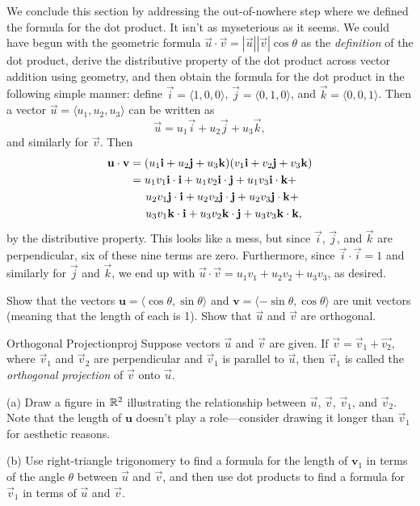 \documentclass{watsonbook}
\begin{document}
We conclude this section by addressing the out-of-nowhere step where
we defined the formula for the dot product. It isn't as myseterious as
it seems. We could have begun with the geometric formula
$\vec{u} \cdot \vec{v} = |\vec{u}| |\vec{v}| \cos\theta$
as the \textit{definition} of the dot product, derive the distributive
property of the dot product across vector addition using geometry, and
then obtain the formula for the dot product in the following simple
manner: define $\vec{i} = \langle1,0,0\rangle$,
$\vec{j} = \langle0,1,0\rangle$, and
$\vec{k} = \langle0,0,1\rangle$. Then a vector
$\vec{u} = \langle u_1, u_2, u_3\rangle$ can be written as
\[
\vec{u} = u_1 \vec{i} + u_2 \vec{j} + u_3 \vec{k},
\]
and similarly for $\vec{v}$. Then 
\begin{align*}
  \vec{u} \cdot \vec{v} &= (u_1 \vec{i} + u_2 \vec{j} + u_3
  \vec{k})(v_1 \vec{i} + v_2 \vec{j} + v_3 \vec{k})  \\
  &= u_1 v_1 \vec{i} \cdot \vec{i} + u_1 v_2 \vec{i} \cdot
    \vec{j}  + u_1 v_3 \vec{i} \cdot \vec{k}  + \\ 
  &\hspace{5mm}  u_2 v_1 \vec{j} \cdot \vec{i} + u_2 v_2 \vec{j} \cdot
    \vec{j}  + u_2 v_3 \vec{j} \cdot \vec{k}  + \\ 
  &\hspace{5mm}  u_3 v_1 \vec{k} \cdot \vec{i} + u_3 v_2 \vec{k} \cdot
    \vec{j}  + u_3 v_3 \vec{k} \cdot \vec{k},
\end{align*}
by the distributive property. This looks like a mess, but since
$\vec{i}$,  $\vec{j}$, and  $\vec{k}$ are 
perpendicular, six of these nine terms are zero. Furthermore, since
$\vec{i}\cdot \vec{i} = 1$ and similarly for $\vec{j}$ and
$\vec{k}$, we end up with $  \vec{u} \cdot \vec{v}  = u_1 v_1
+ u_2 v_2 + u_3 v_3$, as desired.

\begin{exercise}{}{}
  Show that the vectors
  $\mathbf{u} = \langle \cos \theta, \sin \theta \rangle$ and
  $\mathbf{v} = \langle -\sin \theta, \cos \theta \rangle$ are unit
  vectors (meaning that the length of each is 1). Show that $\vec{u}$
  and $\vec{v}$ are orthogonal.
\end{exercise}

\begin{exercise}{Orthogonal Projection}{proj}
  Suppose vectors $\vec{u}$ and $\vec{v}$ are given. If
  $\vec{v} = \vec{v}_1 + \vec{v_2}$, where $\vec{v}_1$ and
  $\vec{v}_2$ are perpendicular and $\vec{v}_1$ is parallel to
  $\vec{u}$, then $\vec{v}_1$ is called the \textit{orthogonal
    projection} of $\vec{v}$ onto $\vec{u}$.

  (a) Draw a figure in $\R^2$ illustrating the relationship between
  $\vec{u}$, $\vec{v}$, $\vec{v}_1$, and $\vec{v}_2$. Note that the
  length of $\mathbf{u}$ doesn't play a role---consider drawing it
  longer than $\vec{v}_1$ for aesthetic reasons.

  (b) Use right-triangle trigonomery to find a formula for the length
  of $\mathbf{v}_1$ in terms of the angle $\theta$ between $\vec{u}$
  and $\vec{v}$, and then use dot products to find a formula for
  $\vec{v}_1$ in terms of $\vec{u}$ and $\vec{v}$. 
\end{exercise}
\end{document}
